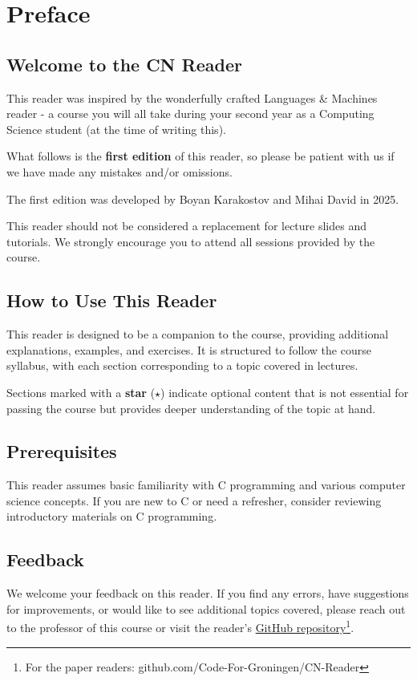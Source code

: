 \chapter*{Preface}
\section*{Welcome to the CN Reader}
This reader was inspired by the wonderfully crafted Languages \& Machines reader - a course you will all take during your second year as a Computing Science student (at the time of writing this).

What follows is the \textbf{first edition} of this reader, so please be patient with us if we have made any mistakes and/or omissions.

The first edition was developed by Boyan Karakostov and Mihai David in 2025.

\begin{warningblock}
This reader should not be considered a replacement for lecture slides and tutorials. We strongly encourage you to attend all sessions provided by the course.
\end{warningblock}

\section*{How to Use This Reader}
This reader is designed to be a companion to the course, providing additional explanations, examples, and exercises. It is structured to follow the course syllabus, with each section corresponding to a topic covered in lectures.

Sections marked with a \textbf{star} ($\star$) indicate optional content that is not essential for passing the course but provides deeper understanding of the topic at hand.

\section*{Prerequisites}
This reader assumes basic familiarity with C programming and various computer science concepts. If you are new to C or need a refresher, consider reviewing introductory materials on C programming.

\section*{Feedback}
We welcome your feedback on this reader. If you find any errors, have suggestions for improvements, or would like to see additional topics covered, please reach out to the professor of this course or visit the reader's \href{https://github.com/Code-For-Groningen/CN-Reader}{GitHub repository}\footnote{For the paper readers: github.com/Code-For-Groningen/CN-Reader}.

